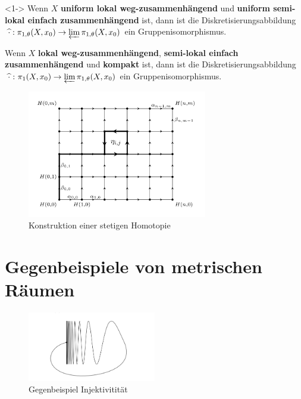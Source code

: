 \documentclass[12pt, aspectratio=169]{beamer}
\begin{document}
\begin{frame}
    \begin{Theorem}<1-> \label{thm:isomorphism}
        Wenn $X$ \textbf{uniform lokal weg-zusammenhängend} und \textbf{uniform semi-lokal einfach zusammenhängend} ist, 
        dann ist die Diskretisierungsabbildung $\: \widehat{\cdot} : \pi_{1,\theta}(X, x_0) \to \varprojlim \pi_{1,\theta}(X, x_0)$ ein Gruppenisomorphismus.
    \end{Theorem}

    \begin{Folgerung}
        Wenn $X$ \textbf{lokal weg-zusammenhängend}, \textbf{semi-lokal einfach zusammenhängend} und \textbf{kompakt} ist, dann ist die Diskretisierungsabbildung 
        $\hspace*{2px}\widehat{\cdot}\hspace*{2px}\colon \pi_1(X, x_0) \to \varprojlim \pi_{1,\theta}(X, x_0)$
        ein Gruppenisomorphismus.
    \end{Folgerung}
\end{frame}

\begin{frame}
    \begin{figure}
        \centering
        \includegraphics[width=0.7\textwidth]{plot/ProofPic.png}
        \caption{Konstruktion einer stetigen Homotopie \cite{vigolo2018fundamental}}        
    \end{figure}
\end{frame}

\section{Gegenbeispiele von metrischen Räumen}

\begin{frame}
    \begin{figure}
        \centering
        \includegraphics[width=0.5\textwidth]{ex1.png}
        \caption{Gegenbeispiel Injektivitität \cite[p. 8]{vigolo2018fundamental}}
    \end{figure}
\end{frame}
\end{document}
